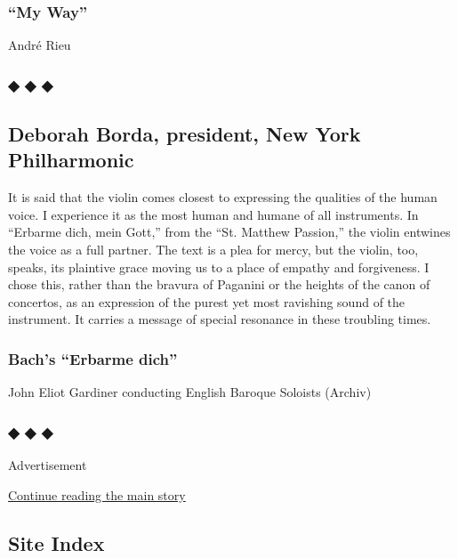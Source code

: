 \hypertarget{my-way}{%
\subsubsection{``My Way''}\label{my-way}}

André Rieu

\hypertarget{---16}{%
\subsubsection{◆ ◆ ◆}\label{---16}}

\hypertarget{deborah-borda-president-new-york-philharmonic}{%
\subsection{Deborah Borda, president, New York
Philharmonic}\label{deborah-borda-president-new-york-philharmonic}}

It is said that the violin comes closest to expressing the qualities of
the human voice. I experience it as the most human and humane of all
instruments. In ``Erbarme dich, mein Gott,'' from the ``St. Matthew
Passion,'' the violin entwines the voice as a full partner. The text is
a plea for mercy, but the violin, too, speaks, its plaintive grace
moving us to a place of empathy and forgiveness. I chose this, rather
than the bravura of Paganini or the heights of the canon of concertos,
as an expression of the purest yet most ravishing sound of the
instrument. It carries a message of special resonance in these troubling
times.

\hypertarget{bachs-erbarme-dich}{%
\subsubsection{Bach's ``Erbarme dich''}\label{bachs-erbarme-dich}}

John Eliot Gardiner conducting English Baroque Soloists (Archiv)

\hypertarget{---17}{%
\subsubsection{◆ ◆ ◆}\label{---17}}

Advertisement

\protect\hyperlink{after-bottom}{Continue reading the main story}

\hypertarget{site-index}{%
\subsection{Site Index}\label{site-index}}

